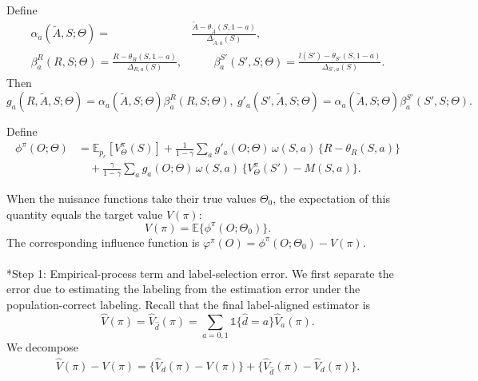 \documentclass[12pt]{article}
\makeatletter
\let\oldparagraph\paragraph
\renewcommand{\paragraph}{
        \@ifstar
            \xxxParagraphStar
            \xxxParagraphNoStar
    }
\newcommand{\xxxParagraphStar}[1]{\oldparagraph*{#1}\mbox{}}
\newcommand{\xxxParagraphNoStar}[1]{\oldparagraph{#1}\mbox{}}
\newcommand{\0}{\boldsymbol{0}}
\makeatother
\begin{document}
Define
\begin{align*}
\alpha_a(\widetilde A,S;\Theta)=&\frac{\widetilde A-\theta_{\tilde A}(S,1-a)}{\Delta_{\tilde A,a}(S)},\\
\beta^R_a(R,S;\Theta)=\frac{R-\theta_R(S,1-a)}{\Delta_{R,a}(S)}, & \qquad
\beta^{S'}_a(S',S;\Theta)=\frac{l(S')-\theta_{S'}(S,1-a)}{\Delta_{S',a}(S)}.
\end{align*}
Then
$g_a(R,\widetilde A,S;\Theta) = \alpha_a(\widetilde A,S;\Theta)\beta^R_a(R,S;\Theta),\ 
g'_a(S',\widetilde A,S;\Theta) = \alpha_a(\widetilde A,S;\Theta)\beta^{S'}_a(S',S;\Theta).$ 


Define 
\begin{align}
\phi^\pi(O;\Theta)&=
\mathbb{E}_{p_e}[V^\pi_\Theta(S)]+\frac{1}{1-\gamma}\sum_a g'_a(O;\Theta)\,\omega(S,a)\,\{R-\theta_R(S,a)\} \nonumber\\
&\quad +\frac{\gamma}{1-\gamma}\sum_a g_a(O;\Theta)\,\omega(S,a)\,\{V^\pi_\Theta(S')-M(S,a)\}.
\label{eq:Psi}
\end{align}

When the nuisance functions take their true values \(\Theta_0\), the expectation of this quantity equals the target value \(V(\pi)\):
\[
V(\pi)=\mathbb{E}\{\phi^\pi(O;\Theta_0)\}.
\]
The corresponding influence function is
$\varphi^\pi(O)=\phi^\pi(O;\Theta_0)-V(\pi).$


\paragraph*{Step 1: Empirical-process term and label-selection error.}
We first separate the error due to estimating the labeling from the estimation error under the population-correct labeling. Recall that the final label-aligned estimator is
\[
\widehat V(\pi)=\widehat V_{\widehat d}(\pi)=\sum_{a=0,1} \mathds 1\{\widehat d=a\}\widehat V_a(\pi).
\]
We decompose
\begin{align}\label{eq:decomposition}
\widehat V(\pi)-V(\pi)=\{\widehat V_d(\pi)-V(\pi)\}+\{\widehat V_{\widehat d}(\pi)-\widehat V_d(\pi)\}.
\end{align}
\end{document}

